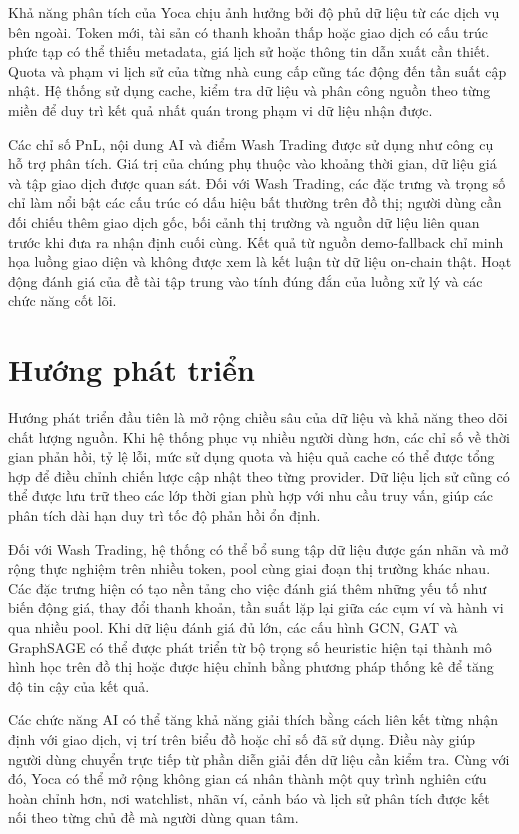 Khả năng phân tích của Yoca chịu ảnh hưởng bởi độ phủ dữ liệu từ các dịch vụ bên ngoài. Token mới, tài sản có thanh khoản thấp hoặc giao dịch có cấu trúc phức tạp có thể thiếu metadata, giá lịch sử hoặc thông tin dẫn xuất cần thiết. Quota và phạm vi lịch sử của từng nhà cung cấp cũng tác động đến tần suất cập nhật. Hệ thống sử dụng cache, kiểm tra dữ liệu và phân công nguồn theo từng miền để duy trì kết quả nhất quán trong phạm vi dữ liệu nhận được.

Các chỉ số PnL, nội dung AI và điểm Wash Trading được sử dụng như công cụ hỗ trợ phân tích. Giá trị của chúng phụ thuộc vào khoảng thời gian, dữ liệu giá và tập giao dịch được quan sát. Đối với Wash Trading, các đặc trưng và trọng số chỉ làm nổi bật các cấu trúc có dấu hiệu bất thường trên đồ thị; người dùng cần đối chiếu thêm giao dịch gốc, bối cảnh thị trường và nguồn dữ liệu liên quan trước khi đưa ra nhận định cuối cùng. Kết quả từ nguồn demo-fallback chỉ minh họa luồng giao diện và không được xem là kết luận từ dữ liệu on-chain thật. Hoạt động đánh giá của đề tài tập trung vào tính đúng đắn của luồng xử lý và các chức năng cốt lõi.

\section{Hướng phát triển}

Hướng phát triển đầu tiên là mở rộng chiều sâu của dữ liệu và khả năng theo dõi chất lượng nguồn. Khi hệ thống phục vụ nhiều người dùng hơn, các chỉ số về thời gian phản hồi, tỷ lệ lỗi, mức sử dụng quota và hiệu quả cache có thể được tổng hợp để điều chỉnh chiến lược cập nhật theo từng provider. Dữ liệu lịch sử cũng có thể được lưu trữ theo các lớp thời gian phù hợp với nhu cầu truy vấn, giúp các phân tích dài hạn duy trì tốc độ phản hồi ổn định.

Đối với Wash Trading, hệ thống có thể bổ sung tập dữ liệu được gán nhãn và mở rộng thực nghiệm trên nhiều token, pool cùng giai đoạn thị trường khác nhau. Các đặc trưng hiện có tạo nền tảng cho việc đánh giá thêm những yếu tố như biến động giá, thay đổi thanh khoản, tần suất lặp lại giữa các cụm ví và hành vi qua nhiều pool. Khi dữ liệu đánh giá đủ lớn, các cấu hình GCN, GAT và GraphSAGE có thể được phát triển từ bộ trọng số heuristic hiện tại thành mô hình học trên đồ thị hoặc được hiệu chỉnh bằng phương pháp thống kê để tăng độ tin cậy của kết quả.

Các chức năng AI có thể tăng khả năng giải thích bằng cách liên kết từng nhận định với giao dịch, vị trí trên biểu đồ hoặc chỉ số đã sử dụng. Điều này giúp người dùng chuyển trực tiếp từ phần diễn giải đến dữ liệu cần kiểm tra. Cùng với đó, Yoca có thể mở rộng không gian cá nhân thành một quy trình nghiên cứu hoàn chỉnh hơn, nơi watchlist, nhãn ví, cảnh báo và lịch sử phân tích được kết nối theo từng chủ đề mà người dùng quan tâm.

